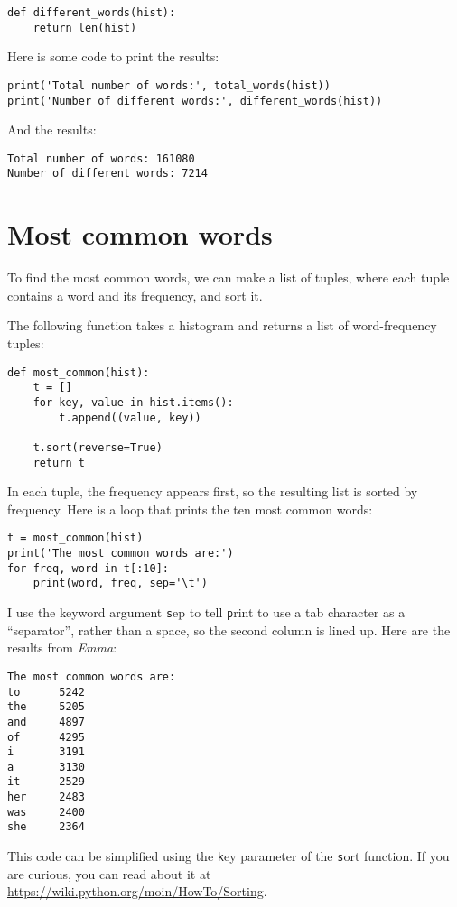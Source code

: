\documentclass[
DIV=11,
fontsize=13,
twoside,
headinclude=false,
titlepage=firstiscover,
abstract=true,
headsepline=true,
footsepline=true,
chapterprefix=true, %
headings=big,
bibliography=totoc,%
captions=tableheading
]{scrbook}
\theoremstyle{definition}
\begin{document}
\begin{lstlisting}
def different_words(hist):
    return len(hist)
\end{lstlisting}
%
Here is some code to print the results:

\begin{lstlisting}
print('Total number of words:', total_words(hist))
print('Number of different words:', different_words(hist))
\end{lstlisting}
%
And the results:

\begin{lstlisting}
Total number of words: 161080
Number of different words: 7214
\end{lstlisting}
%

\section{Most common words}

To find the most common words, we can make a list of tuples,
where each tuple contains a word and its frequency,
and sort it.

The following function takes a histogram and returns a list of
word-frequency tuples:

\begin{lstlisting}
def most_common(hist):
    t = []
    for key, value in hist.items():
        t.append((value, key))

    t.sort(reverse=True)
    return t
\end{lstlisting}

In each tuple, the frequency appears first, so the resulting list is
sorted by frequency.  Here is a loop that prints the ten most common
words:

\begin{lstlisting}
t = most_common(hist)
print('The most common words are:')
for freq, word in t[:10]:
    print(word, freq, sep='\t')
\end{lstlisting}
%
I use the keyword argument {\texttt sep} to tell {\texttt print} to use a tab
character as a ``separator'', rather than a space, so the second
column is lined up.  Here are the results from {\em Emma}:

\begin{lstlisting}
The most common words are:
to      5242
the     5205
and     4897
of      4295
i       3191
a       3130
it      2529
her     2483
was     2400
she     2364
\end{lstlisting}
%
This code can be simplified using the {\texttt key} parameter of
the {\texttt sort} function.  If you are curious, you can read about it
at \url{https://wiki.python.org/moin/HowTo/Sorting}.
\end{document}
